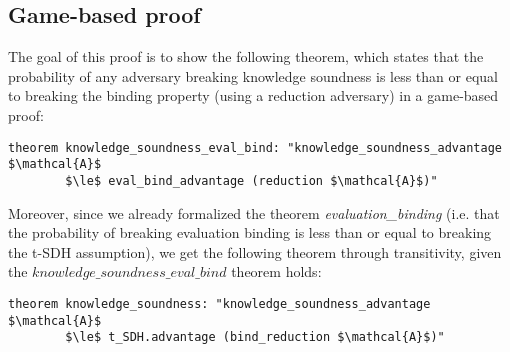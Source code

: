 \subsection*{Game-based proof}
\label{security:knowledge:gamebased}
The goal of this proof is to show the following theorem, which states that the probability of any adversary breaking  knowledge soundness is less than or equal to breaking the binding property (using a reduction adversary) in a game-based proof:
\begin{lstlisting}[language=isabelle]
    theorem knowledge_soundness_eval_bind: "knowledge_soundness_advantage $\mathcal{A}$ 
        $\le$ eval_bind_advantage (reduction $\mathcal{A}$)"
\end{lstlisting}
Moreover, since we already formalized the theorem \textit{evaluation\_binding} (i.e. that the probability of breaking evaluation binding is less than or equal to breaking the t-SDH assumption), we get the following theorem through transitivity, given the $knowledge\_soundness\_eval\_bind$ theorem holds: 

\begin{lstlisting}[language=isabelle]
    theorem knowledge_soundness: "knowledge_soundness_advantage $\mathcal{A}$ 
        $\le$ t_SDH.advantage (bind_reduction $\mathcal{A}$)"
\end{lstlisting}

